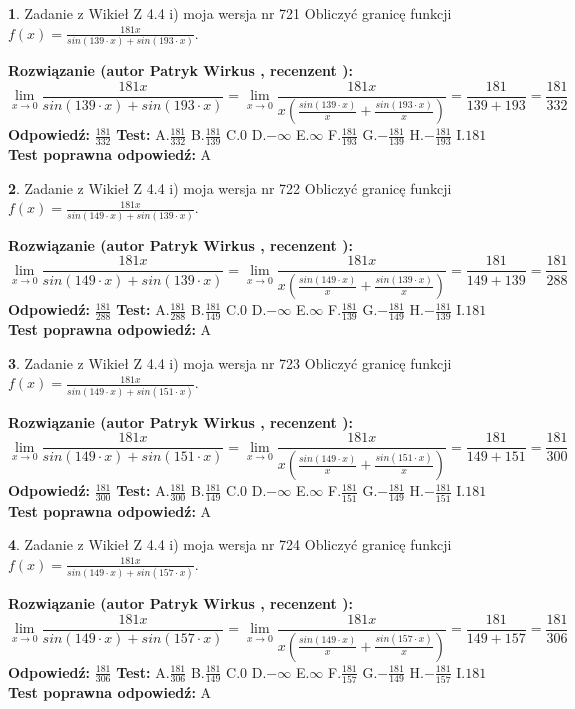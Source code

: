 \documentclass[12pt, a4paper]{article}
\theoremstyle{definition} %
\newtheorem{zad}{}
\newcommand{\zadStart}[1]{\begin{zad}#1\newline}
\newcommand{\zadStop}{\end{zad}}
\newcommand{\rozwStart}[2]{\noindent \textbf{Rozwiązanie (autor #1 , recenzent #2): }\newline}
\newcommand{\rozwStop}{\newline}
\newcommand{\odpStart}{\noindent \textbf{Odpowiedź:}\newline}
\newcommand{\odpStop}{\newline}
\newcommand{\testStart}{\noindent \textbf{Test:}\newline}
\newcommand{\testStop}{\newline}
\newcommand{\kluczStart}{\noindent \textbf{Test poprawna odpowiedź:}\newline}
\newcommand{\kluczStop}{\newline}
\begin{document}
\zadStart{Zadanie z Wikieł Z 4.4 i) moja wersja nr 721}
Obliczyć granicę funkcji $f(x)=\frac{181x}{sin(139\cdot x) +sin(193\cdot x)}$.
\zadStop
\rozwStart{Patryk Wirkus}{}
$$\lim\limits_{x\to 0}\frac{181x}{sin(139\cdot x) +sin(193\cdot x)}=\lim\limits_{x\to 0}\frac{181x}{x(\frac{sin(139\cdot x)}{x}+\frac{sin(193\cdot x)}{x})}=\frac{181}{139+193} = \frac{181}{332}$$
\rozwStop
\odpStart
$\frac{181}{332}$
\odpStop
\testStart
A.$\frac{181}{332}$
B.$\frac{181}{139}$
C.$0$
D.$-\infty$
E.$\infty$
F.$\frac{181}{193}$
G.$-\frac{181}{139}$
H.$-\frac{181}{193}$
I.$181$
\testStop
\kluczStart
A
\kluczStop



\zadStart{Zadanie z Wikieł Z 4.4 i) moja wersja nr 722}
Obliczyć granicę funkcji $f(x)=\frac{181x}{sin(149\cdot x) +sin(139\cdot x)}$.
\zadStop
\rozwStart{Patryk Wirkus}{}
$$\lim\limits_{x\to 0}\frac{181x}{sin(149\cdot x) +sin(139\cdot x)}=\lim\limits_{x\to 0}\frac{181x}{x(\frac{sin(149\cdot x)}{x}+\frac{sin(139\cdot x)}{x})}=\frac{181}{149+139} = \frac{181}{288}$$
\rozwStop
\odpStart
$\frac{181}{288}$
\odpStop
\testStart
A.$\frac{181}{288}$
B.$\frac{181}{149}$
C.$0$
D.$-\infty$
E.$\infty$
F.$\frac{181}{139}$
G.$-\frac{181}{149}$
H.$-\frac{181}{139}$
I.$181$
\testStop
\kluczStart
A
\kluczStop



\zadStart{Zadanie z Wikieł Z 4.4 i) moja wersja nr 723}
Obliczyć granicę funkcji $f(x)=\frac{181x}{sin(149\cdot x) +sin(151\cdot x)}$.
\zadStop
\rozwStart{Patryk Wirkus}{}
$$\lim\limits_{x\to 0}\frac{181x}{sin(149\cdot x) +sin(151\cdot x)}=\lim\limits_{x\to 0}\frac{181x}{x(\frac{sin(149\cdot x)}{x}+\frac{sin(151\cdot x)}{x})}=\frac{181}{149+151} = \frac{181}{300}$$
\rozwStop
\odpStart
$\frac{181}{300}$
\odpStop
\testStart
A.$\frac{181}{300}$
B.$\frac{181}{149}$
C.$0$
D.$-\infty$
E.$\infty$
F.$\frac{181}{151}$
G.$-\frac{181}{149}$
H.$-\frac{181}{151}$
I.$181$
\testStop
\kluczStart
A
\kluczStop



\zadStart{Zadanie z Wikieł Z 4.4 i) moja wersja nr 724}
Obliczyć granicę funkcji $f(x)=\frac{181x}{sin(149\cdot x) +sin(157\cdot x)}$.
\zadStop
\rozwStart{Patryk Wirkus}{}
$$\lim\limits_{x\to 0}\frac{181x}{sin(149\cdot x) +sin(157\cdot x)}=\lim\limits_{x\to 0}\frac{181x}{x(\frac{sin(149\cdot x)}{x}+\frac{sin(157\cdot x)}{x})}=\frac{181}{149+157} = \frac{181}{306}$$
\rozwStop
\odpStart
$\frac{181}{306}$
\odpStop
\testStart
A.$\frac{181}{306}$
B.$\frac{181}{149}$
C.$0$
D.$-\infty$
E.$\infty$
F.$\frac{181}{157}$
G.$-\frac{181}{149}$
H.$-\frac{181}{157}$
I.$181$
\testStop
\kluczStart
A
\kluczStop
\end{document}
